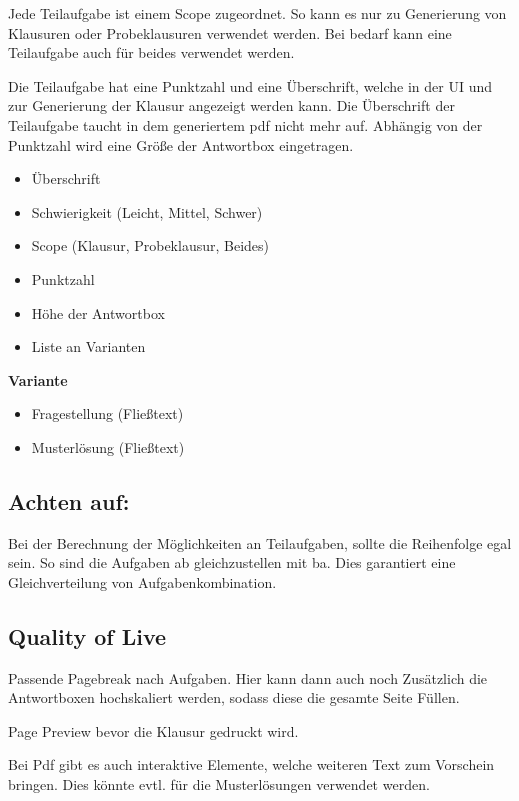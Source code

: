 \documentclass[a4paper]{article}
\begin{document}
Jede Teilaufgabe ist einem Scope zugeordnet. So kann es nur zu Generierung von Klausuren oder Probeklausuren verwendet werden. Bei bedarf kann eine Teilaufgabe auch für beides verwendet werden.

Die Teilaufgabe hat eine Punktzahl und eine Überschrift, welche in der UI und zur Generierung der Klausur angezeigt werden kann. Die Überschrift der Teilaufgabe taucht in dem generiertem pdf nicht mehr auf. Abhängig von der Punktzahl wird eine Größe der Antwortbox eingetragen.

\begin{itemize}
    \item Überschrift
    \item Schwierigkeit (Leicht, Mittel, Schwer)
    \item Scope (Klausur, Probeklausur, Beides)
    \item Punktzahl
    \item Höhe der Antwortbox
    \item Liste an Varianten
\end{itemize}

\textbf{Variante}

\begin{itemize}
    \item Fragestellung (Fließtext)
    \item Musterlösung (Fließtext)
\end{itemize}

\subsection{Achten auf:}

Bei der Berechnung der Möglichkeiten an Teilaufgaben, sollte die Reihenfolge egal sein. So sind die Aufgaben ab gleichzustellen mit ba. Dies garantiert eine Gleichverteilung von Aufgabenkombination.

\subsection{Quality of Live}

Passende Pagebreak nach Aufgaben. Hier kann dann auch noch Zusätzlich die Antwortboxen hochskaliert werden, sodass diese die gesamte Seite Füllen.

Page Preview bevor die Klausur gedruckt wird.

Bei Pdf gibt es auch interaktive Elemente, welche weiteren Text zum Vorschein bringen. Dies könnte evtl. für die Musterlösungen verwendet werden.
\end{document}
